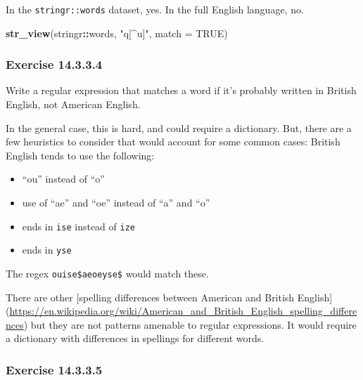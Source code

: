 \documentclass[]{book}
\newenvironment{Shaded}{\begin{snugshade}}{\end{snugshade}}
\newcommand{\DataTypeTok}[1]{\textcolor[rgb]{0.13,0.29,0.53}{#1}}
\newcommand{\KeywordTok}[1]{\textcolor[rgb]{0.13,0.29,0.53}{\textbf{#1}}}
\newcommand{\NormalTok}[1]{#1}
\newcommand{\OperatorTok}[1]{\textcolor[rgb]{0.81,0.36,0.00}{\textbf{#1}}}
\newcommand{\OtherTok}[1]{\textcolor[rgb]{0.56,0.35,0.01}{#1}}
\newcommand{\StringTok}[1]{\textcolor[rgb]{0.31,0.60,0.02}{#1}}
\providecommand{\tightlist}{%
  \setlength{\itemsep}{0pt}\setlength{\parskip}{0pt}}
\theoremstyle{plain}
\theoremstyle{remark}
\theoremstyle{definition}
\theoremstyle{definition}
\theoremstyle{definition}
\theoremstyle{remark}
\begin{document}
In the \texttt{stringr::words} dataset, yes. In the full English
language, no.

\begin{Shaded}
\begin{Highlighting}[]
\KeywordTok{str_view}\NormalTok{(stringr}\OperatorTok{::}\NormalTok{words, }\StringTok{"q[^u]"}\NormalTok{, }\DataTypeTok{match =} \OtherTok{TRUE}\NormalTok{)}
\end{Highlighting}
\end{Shaded}

\hypertarget{exercise-14.3.3.4}{%
\subsubsection*{\texorpdfstring{Exercise
{14.3.3.4}}{Exercise 14.3.3.4}}\label{exercise-14.3.3.4}}

Write a regular expression that matches a word if it's probably written
in British English, not American English.

In the general case, this is hard, and could require a dictionary. But,
there are a few heuristics to consider that would account for some
common cases: British English tends to use the following:

\begin{itemize}
\tightlist
\item
  ``ou'' instead of ``o''
\item
  use of ``ae'' and ``oe'' instead of ``a'' and ``o''
\item
  ends in \texttt{ise} instead of \texttt{ize}
\item
  ends in \texttt{yse}
\end{itemize}

The regex
\texttt{ou\textbar{}ise\$\textbar{}ae\textbar{}oe\textbar{}yse\$} would
match these.

There are other {[}spelling differences between American and British
English{]}
(\url{https://en.wikipedia.org/wiki/American_and_British_English_spelling_differences})
but they are not patterns amenable to regular expressions. It would
require a dictionary with differences in spellings for different words.

\hypertarget{exercise-14.3.3.5}{%
\subsubsection*{\texorpdfstring{Exercise
{14.3.3.5}}{Exercise 14.3.3.5}}\label{exercise-14.3.3.5}}
\end{document}
